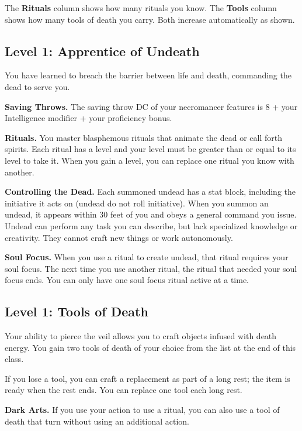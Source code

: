 \documentclass[12pt,letterpaper,twocolumn,openany,nodeprecatedcode,bg=none]{dndbook}
\let\oldsubsection\subsection
\renewcommand{\subsection}[1]{%
  \needspace{5\baselineskip}%
  \oldsubsection{#1}%
}
\begin{document}
The \textbf{Rituals} column shows how many rituals you know. The
\textbf{Tools} column shows how many tools of death you carry. Both
increase automatically as shown.

\subsection{Level 1: Apprentice of
Undeath}\label{level-1-apprentice-of-undeath}

You have learned to breach the barrier between life and death,
commanding the dead to serve you.

\textbf{Saving Throws.} The saving throw DC of your necromancer features
is 8 + your Intelligence modifier + your proficiency bonus.

\textbf{Rituals.} You master blasphemous rituals that animate the dead
or call forth spirits. Each ritual has a level and your level must be
greater than or equal to its level to take it. When you gain a level,
you can replace one ritual you know with another.

\textbf{Controlling the Dead.} Each summoned undead has a stat block,
including the initiative it acts on (undead do not roll initiative).
When you summon an undead, it appears within 30 feet of you and obeys a
general command you issue. Undead can perform any task you can describe,
but lack specialized knowledge or creativity. They cannot craft new
things or work autonomously.

\textbf{Soul Focus.} When you use a ritual to create undead, that ritual
requires your soul focus. The next time you use another ritual, the
ritual that needed your soul focus ends. You can only have one soul
focus ritual active at a time.

\subsection{Level 1: Tools of Death}\label{level-1-tools-of-death}

Your ability to pierce the veil allows you to craft objects infused with
death energy. You gain two tools of death of your choice from the list
at the end of this class.

If you lose a tool, you can craft a replacement as part of a long rest;
the item is ready when the rest ends. You can replace one tool each long
rest.

\textbf{Dark Arts.} If you use your action to use a ritual, you can also
use a tool of death that turn without using an additional action.
\end{document}
